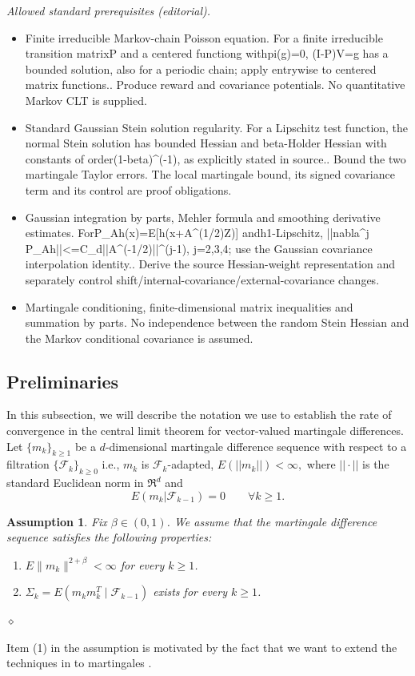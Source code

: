 \documentclass[10pt,a4paper]{article}
\newtheorem{assumption}{Assumption}
\begin{document}
\noindent\textit{Allowed standard prerequisites (editorial).}\begin{itemize}
\item Finite irreducible Markov-chain Poisson equation. For a finite irreducible transition matrixP and a centered functiong withpi(g)=0, (I-P)V=g has a bounded solution, also for a periodic chain; apply entrywise to centered matrix functions.. Produce reward and covariance potentials. No quantitative Markov CLT is supplied.
\item Standard Gaussian Stein solution regularity. For a Lipschitz test function, the normal Stein solution has bounded Hessian and beta-Holder Hessian with constants of order(1-beta)\textasciicircum{}(-1), as explicitly stated in source.. Bound the two martingale Taylor errors. The local martingale bound, its signed covariance term and its control are proof obligations.
\item Gaussian integration by parts, Mehler formula and smoothing derivative estimates. ForP\_Ah(x)=E[h(x+A\textasciicircum{}(1/2)Z)] andh1-Lipschitz, ||nabla\textasciicircum{}j P\_Ah||<=C\_d||A\textasciicircum{}(-1/2)||\textasciicircum{}(j-1), j=2,3,4; use the Gaussian covariance interpolation identity.. Derive the source Hessian-weight representation and separately control shift/internal-covariance/external-covariance changes.
\item Martingale conditioning, finite-dimensional matrix inequalities and summation by parts. No independence between the random Stein Hessian and the Markov conditional covariance is assumed.
\end{itemize}\medskip
\subsection{Preliminaries}

In this subsection, we will describe the notation we use to establish the rate of convergence in the central limit theorem for vector-valued martingale differences. Let $\{m_k\}_{k\geq 1}$ be a $d$-dimensional martingale difference sequence with respect to a filtration $\{\mathcal{F}_k\}_{k\geq 0}$ i.e., $m_k$ is $\mathcal{F}_k$-adapted, $E(||m_k||)<\infty,$ where $||\cdot||$ is the standard Euclidean norm in $\Re^d$ and $$E(m_k|\mathcal{F}_{k-1})=0\qquad \forall k\geq 1.$$ 
\begin{assumption}\label{assume: martingale}
Fix $\beta\in(0,1)$. We assume that the martingale difference sequence satisfies the following properties:
\begin{enumerate}\label{assume}
\item $E\|m_k\|^{2+\beta}<\infty$ for every $k\geq 1$.
\item $\Sigma_k=E(m_km_k^T\mid\mathcal{F}_{k-1})$ exists for every $k\geq 1$.
\end{enumerate}
\hfill $\diamond$
\end{assumption}
Item (1) in the assumption is motivated by the fact that we want to extend the techniques in \citep{gallouet2018regularity} to martingales .
\end{document}
